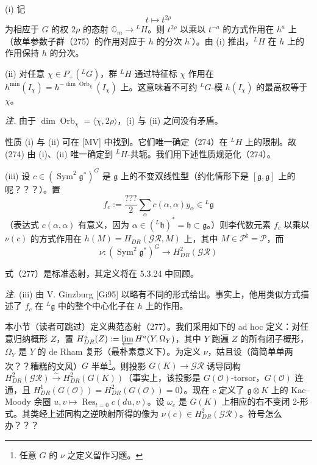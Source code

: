 (i) 记
\begin{equation}\tag{275}
t\mapsto t^{2\rho}
\end{equation}
为相应于 $G$ 的权 $2\rho$ 的态射 $\mathbb{G}_m\to{}^{L}H$。则 $t^{2\rho}$ 以乘以 $t^{-a}$ 的方式作用在 $h^a$ 上（故单参数子群（275）的作用对应于 $h$ 的分次 $h^{\cdot}$）。由 (i) 推出，${}^{L}H$ 在 $h$ 上的作用保持 $h$ 的分次。

(ii) 对任意 $\chi\in P_+({}^{L}G)$，群 ${}^{L}H$ 通过特征标 $\chi$ 作用在 $h^{\min}(I_{\chi})=h^{-\dim\operatorname{Orb}_{\chi}}(I_{\chi})$ 上。这意味着不可约 ${}^{L}G$-模 $h(I_{\chi})$ 的最高权等于 $\chi$。

\emph{注.} 由于 $\dim\operatorname{Orb}_{\chi}=\langle\chi,2\rho\rangle$，(i) 与 (ii) 之间没有矛盾。

性质 (i) 与 (ii) 可在 [MV] 中找到。它们唯一确定（274）在 ${}^{L}H$ 上的限制。故 (274) 由 (i)、(ii) 唯一确定到 ${}^{L}H$-共轭。我们用下述性质规范化（274）。

(iii) 设 $c\in(\operatorname{Sym}^2\mathfrak{g}^*)^G$ 是 $\mathfrak{g}$ 上的不变双线性型（约化情形下是 $[\mathfrak{g},\mathfrak{g}]$ 上的呢？？？）。置
\begin{equation}\tag{276}
f_c:=\frac{???}{2}\sum_{\alpha}c(\alpha,\alpha)y_{\alpha}\in{}^{L}\mathfrak{g}
\end{equation}
（表达式 $c(\alpha,\alpha)$ 有意义，因为 $\alpha\in({}^{L}\mathfrak{h})^*=\mathfrak{h}\subset\mathfrak{g}$。）则李代数元素 $f_c$ 以乘以 $\nu(c)$ 的方式作用在 $h(M)=H^{\cdot}_{DR}(\mathcal{GR},M)$ 上，其中 $M\in\mathcal{P}^{\natural}=\mathcal{P}$，而
\begin{equation}\tag{277}
\nu:(\operatorname{Sym}^2\mathfrak{g}^*)^G\to H^2_{DR}(\mathcal{GR})
\end{equation}


式（277）是标准态射，其定义将在 5.3.24 中回顾。

\emph{注.} (iii) 由 V. Ginzburg [Gi95] 以略有不同的形式给出。事实上，他用类似方式描述了 $f_c$ 在 ${}^{L}\mathfrak{g}$ 中的整个中心化子在 $h$ 上的作用。

 本小节（读者可跳过）定义典范态射（277）。我们采用如下的 ad hoc 定义：对任意归纳概形 $Z$，置 $H^a_{DR}(Z):=\varprojlim H^a(Y,\Omega_Y)$，其中 $Y$ 跑遍 $Z$ 的所有闭子概形，$\Omega_Y$ 是 $Y$ 的 de Rham 复形（最朴素意义下）。为定义 $\nu$，姑且设（简简单单两次？？糟糕的文风）$G$ 半单\footnote{任意 $G$ 的 $\nu$ 之定义留作习题。}。则投影 $G(K)\to\mathcal{GR}$ 诱导同构 $H^2_{DR}(\mathcal{GR})\xrightarrow{\sim}H^2_{DR}(G(K))$（事实上，该投影是 $G(\mathcal{O})$-torsor，$G(\mathcal{O})$ 连通，且 $H^1_{DR}(G(\mathcal{O}))=H^2_{DR}(G(\mathcal{O}))=0$）。现在 $c$ 定义了 $\mathfrak{g}\otimes K$ 上的 Kac–Moody 余圈 $u,v\mapsto\operatorname{Res}_{t=0}c(du,v)$。设 $\omega_c$ 是 $G(K)$ 上相应的右不变闭 2-形式。其类经上述同构之逆映射所得的像为 $\nu(c)\in H^2_{DR}(\mathcal{GR})$。符号怎么办？？？

